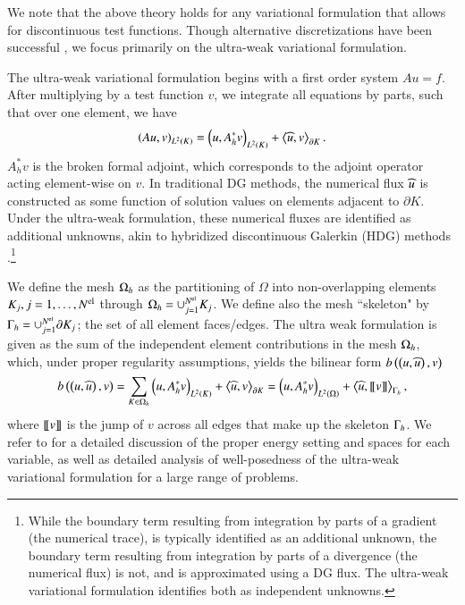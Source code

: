 We note that the above theory holds for any variational formulation that allows for discontinuous test functions.  Though alternative discretizations have been successful \cite{primalDPG}, we focus primarily on the ultra-weak variational formulation.  

The ultra-weak variational formulation begins with a first order system $Au = f$.  After multiplying by a test function $v$, we integrate all equations by parts, such that over one element, we have
\[
\LRp{Au,v}_{L^2(K)} = \LRp{u,A_h^*v}_{L^2(K)} + \LRa{\uh,v}_{\partial K}.
\]
$A_h^*v$ is the broken formal adjoint, which corresponds to the adjoint operator acting element-wise on $v$.  In traditional DG methods, the numerical flux $\uh$ is constructed as some function of solution values on elements adjacent to $\partial K$.  Under the ultra-weak formulation, these numerical fluxes are identified as additional unknowns, akin to hybridized discontinuous Galerkin (HDG) methods \cite{hybridDG}.\footnote{While the boundary term resulting from integration by parts of a gradient (the numerical trace), is typically identified as an additional unknown, the boundary term resulting from integration by parts of a divergence (the numerical flux) is not, and is approximated using a DG flux.  The ultra-weak variational formulation identifies both as independent unknowns.} 

We define the mesh $\Oh$ as the partitioning of $\Omega$ into non-overlapping elements $K_j, j = 1,\hdots,\Nel$ through $\Oh = \cup_{j=1}^\Nel K_j$.  We define also the mesh ``skeleton" by $\Gh = \cup_{j=1}^\Nel \partial K_j$; the set of all element faces/edges. The ultra weak formulation is given as the sum of the independent element contributions in the mesh $\Oh$, which, under proper regularity assumptions, yields the bilinear form $b\LRp{\LRp{u,\uh},v}$ 
\[
b\LRp{\LRp{u,\uh},v} = \sum_{K\in \Oh} \LRp{u,A_h^*v}_{L^2(K)} + \LRa{\uh,v}_{\partial K} = \LRp{u,A^*_h v}_{\L} + \LRa{\uh,\jump{v}}_{\Gh},
\]
where $\jump{v}$ is the jump of $v$ across all edges that make up the skeleton $\Gh$.  We refer to \cite{analysisDPG, Bui-ThanhDemkowiczGhattas11b, stokesDPG} for a detailed discussion of the proper energy setting and spaces for each variable, as well as detailed analysis of well-posedness of the ultra-weak variational formulation for a large range of problems.  


